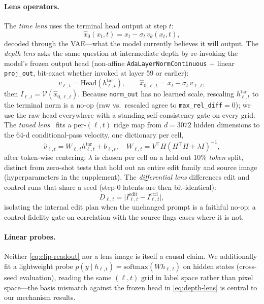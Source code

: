 \documentclass[letterpaper]{article} %
\begin{document}
\paragraph{Lens operators.}
The \emph{time lens} uses the terminal head output at step $t$:
\begin{equation}
  \hat{x}_0(x_t,t) = x_t - \sigma_t\, v_\theta(x_t,t),
  \label{eq:time-lens}
\end{equation}
decoded through the VAE---what the model currently believes it will output.
The \emph{depth lens} asks the same question at intermediate depth by
re-invoking the model's frozen output head (non-affine
\texttt{AdaLayerNormContinuous} + linear \texttt{proj\_out}, bit-exact
whether invoked at layer 59 or earlier):
\begin{equation}
  v_{\ell,t} = \mathrm{Head}(h^{\mathrm{tar}}_{\ell,t}),
  \qquad
  \hat{x}_{0,\ell,t} = x_t - \sigma_t\, v_{\ell,t},
  \label{eq:depth-lens}
\end{equation}
then $I_{\ell,t}=\mathcal{V}(\hat{x}_{0,\ell,t})$.
Because \texttt{norm\_out} has no learned scale, rescaling $h^{\mathrm{tar}}_{\ell,t}$ to
the terminal norm is a no-op (raw vs.\ rescaled agree to
\texttt{max\_rel\_diff}$=0$); we use the raw head everywhere with a
standing self-consistency gate on every grid.
The \emph{tuned lens}~\citep{belrose2023tuned} fits a per-$(\ell,t)$ ridge map
from $d{=}3072$ hidden dimensions to the $64$-d conditional-pass velocity,
one dictionary per cell,
\begin{equation}
  \hat{v}_{\ell,t} = W_{\ell,t} h^{\mathrm{tar}}_{\ell,t} + b_{\ell,t},
  \quad
  W_{\ell,t} = V^\top H (H^\top H + \lambda I)^{-1},
  \label{eq:tuned-lens}
\end{equation}
after token-wise centering; $\lambda$ is chosen per cell on a held-out
$10\%$ \emph{token} split, distinct from zero-shot tests that hold out an
entire edit family and source image (hyperparameters in the supplement).
The \emph{differential lens} differences edit and control runs that share a
seed (step-0 latents are then bit-identical):
\begin{equation}
  D_{\ell,t}
  = \bigl|I^{\mathrm{edit}}_{\ell,t}
  - I^{\mathrm{ctrl}}_{\ell,t}\bigr|,
  \label{eq:diff-lens}
\end{equation}
isolating the internal edit plan when the unchanged prompt is a faithful
no-op; a control-fidelity gate on correlation with the source flags cases
where it is not.

\paragraph{Linear probes.}
Neither \eqref{eq:clip-readout} nor a lens image is itself a causal claim.
We additionally fit a lightweight probe
$p(y \mid h_{\ell,t}) = \mathrm{softmax}(W h_{\ell,t})$ on hidden states
(cross-seed evaluation), reading the same $(\ell,t)$ grid in label space
rather than pixel space---the basis mismatch against the frozen head in
\eqref{eq:depth-lens} is central to our mechanism results.
\end{document}
